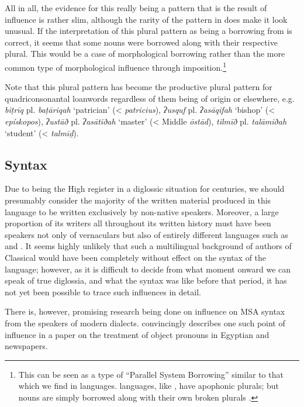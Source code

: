 \documentclass[output=paper]{langsci/langscibook}
\begin{document}
All in all, the evidence for this really being a pattern that is the result of  influence is rather slim, although the rarity of the pattern in  does make it look unusual. If the interpretation of this plural pattern as being a borrowing from  is correct, it seems that some  nouns were borrowed along with their respective plural. This would be a case of morphological borrowing rather than the more common type of morphological influence through {imposition}.\footnote{This can be seen as a type of “Parallel System Borrowing” similar to that which we find in  languages.  languages, like , have apophonic plurals; but  nouns are simply borrowed along with their own  broken plurals \citep{Kossmann2010}.} 

Note that this plural pattern has become the productive plural pattern for quadriconsonantal {loanwords} regardless of them being of  origin or elsewhere, e.g. \textit{biṭrīq} pl. \textit{baṭāriqah} ‘patrician’ (<  \textit{patricius}), \textit{ʔusquf} pl. \textit{ʔasāqifah} ‘bishop’ (<  \textit{epískopos}), \textit{ʔustāð} pl. \textit{ʔasātiðah} ‘master’ (< Middle  \textit{ōstād}), \textit{tilmīð} pl. \textit{talāmiðah} ‘student’ (<  \textit{talmīḏ}).

\subsection{\label{bkm:Ref13224809}Syntax}

Due to  being the High {register} in a diglossic situation for centuries, we should presumably consider the majority of the written material produced in this language to be written exclusively by non-native speakers. Moreover, a large proportion of its writers all throughout its written history must have been speakers not only of  vernaculars but also of entirely different languages such as  and . It seems highly unlikely that such a multilingual background of authors of Classical  would have been completely without effect on the syntax of the language; however, as it is difficult to decide from what moment onward we can speak of true {diglossia}, and what the syntax was like before that period, it has not yet been possible to trace such influences in detail.

There is, however, promising research being done on influence on MSA syntax from the speakers of modern  dialects. \citet{Wilmsen2010} convincingly describes one such point of influence in a paper on the treatment of object pronouns in Egyptian and  newspapers.
\end{document}
